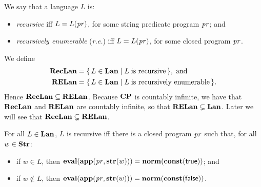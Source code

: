 %
%
%
%
We say that a language $L$ is:
\begin{itemize}
\item \emph{recursive} iff $L=L(\mathit{pr})$, for some string predicate program $\mathit{pr}$;
  and

\item \emph{recursively enumerable} (\emph{r.e.}) iff $L=L(\mathit{pr})$, for
  some closed program $\mathit{pr}$.
\end{itemize}

We define
%
%
%
%
\begin{align*}
\mathbf{RecLan} &= \{ \, L\in\mathbf{Lan} \mid L\;\allowbreak\mbox{is recursive}\allowbreak \, \} , \;\allowbreak\mbox{and}\allowbreak \\
\mathbf{RELan} &= \{ \, L\in\mathbf{Lan} \mid L\;\allowbreak\mbox{is recursively enumerable}\allowbreak \, \} .
\end{align*}
Hence $\mathbf{RecLan}\subseteq\mathbf{RELan}$.  Because $\mathbf{CP}$ is countably infinite, we
have that $\mathbf{RecLan}$ and $\mathbf{RELan}$ are countably infinite, so that
$\mathbf{RELan}\subsetneq\mathbf{Lan}$.  Later we will see that
$\mathbf{RecLan}\subsetneq\mathbf{RELan}$.

\begin{proposition}
\label{RecProp}
For all $L\in\mathbf{Lan}$, $L$ is recursive iff there is a closed program $\mathit{pr}$ such
that, for all $w\in\mathbf{Str}$:
\begin{itemize}
\item if $w\in L$, then $\mathbf{eval}(\mathbf{app}(\mathit{pr},\mathbf{str}(w)))=
\mathbf{norm}(\mathbf{const}(\mathsf{true}))$; and

\item if $w\not\in L$, then
$\mathbf{eval}(\mathbf{app}(\mathit{pr},\mathbf{str}(w)))=\mathbf{norm}(\mathbf{const}(\mathsf{false}))$.
\end{itemize}
\end{proposition}

